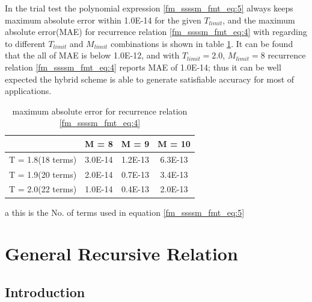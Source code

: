 In the trial test the polynomial expression \ref{fm_ssssm_fmt_eq:5} 
always keeps maximum absolute error within 1.0E-14 for the given $T_{limit}$, and the 
maximum absolute error(MAE) for recurrence relation \ref{fm_ssssm_fmt_eq:4} with regarding to 
different $T_{limit}$ and $M_{limit}$ combinations is shown in table \ref{table:1}. 
It can be found that the all of MAE is below 1.0E-12, and 
with $T_{limit}=2.0$, $M_{limit}=8$ recurrence relation \ref{fm_ssssm_fmt_eq:4} reports
MAE of 1.0E-14; thus it can be well expected the hybrid scheme is able to generate satisfiable
accuracy for most of applications.

\begin{table}
\caption{maximum absolute error for recurrence relation \ref{fm_ssssm_fmt_eq:4}}
\label{table:1}
\begin{center}
\begin{threeparttable}
\begin{tabular}{c|c|c|c}
\hline
                    &       M = 8         &      M = 9        &   M = 10          \\
\hline
T = 1.8(18 terms)\tnote{a}   
                    &       3.0E-14       &      1.2E-13      &   6.3E-13         \\
\hline
T = 1.9(20 terms)   &       2.0E-14       &      0.7E-13      &   3.4E-13         \\
\hline
T = 2.0(22 terms)   &       1.0E-14       &      0.4E-13      &   2.0E-13         \\
\hline
\end{tabular}
\begin{tablenotes}
    \item[a] this is the No. of terms used in equation \ref{fm_ssssm_fmt_eq:5}
\end{tablenotes}
\end{threeparttable}
\end{center}
\end{table} 


\section{General Recursive Relation}
%
%
%
\subsection{Introduction}
%
%
%
\label{rr_introduction}

